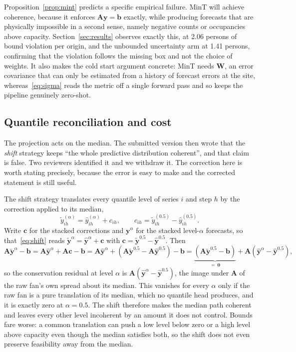 \documentclass[11pt]{article}
\theoremstyle{plain}
\theoremstyle{definition}
\theoremstyle{remark}
\newcommand{\bA}{\bm{A}}
\newcommand{\by}{\bm{y}}
\newcommand{\bb}{\bm{b}}
\newcommand{\yhat}{\hat{\by}}
\newcommand{\ytil}{\tilde{\by}}
\newif\ifrevisionmarkup
\newcommand{\new}[1]{\ifrevisionmarkup\textcolor{revision}{#1}\else#1\fi}
\begin{document}
Proposition~\ref{prop:mint} predicts a specific empirical failure. MinT will achieve coherence, because it enforces $\bA\by=\bb$ exactly, while producing forecasts that are physically impossible in a second sense, namely negative counts or occupancies above capacity. Section~\ref{sec:results} observes exactly this, at \new{\num{2.06}} persons of bound violation per origin\new{, and the unbounded uncertainty arm at \num{1.41} persons, confirming that the violation follows the missing box and not the choice of weights}. It also makes the cold start argument concrete: MinT needs $\bm{W}$, an error covariance that can only be estimated from a history of forecast errors at the site, whereas~\eqref{eq:sigma} reads the metric off a single forward pass and so keeps the pipeline genuinely zero-shot.

\subsection{Quantile reconciliation and cost}

The projection acts on the median. The submitted version then wrote that the \emph{shift} strategy keeps ``the whole predictive distribution coherent'', and \new{that claim is false. Two reviewers identified it and we withdraw it. The correction here is worth stating precisely, because the error is easy to make and the corrected statement is still useful.}

The shift strategy translates every quantile level of series $i$ and step $h$ by the correction applied to its median,
\begin{equation}
\tilde{y}^{(\alpha)}_{ih} = \hat{y}^{(\alpha)}_{ih} + c_{ih},
\qquad
c_{ih} = \tilde{y}^{(0.5)}_{ih} - \hat{y}^{(0.5)}_{ih}.
\label{eq:shift}
\end{equation}
\new{Write $\bm{c}$ for the stacked corrections and $\by^{\alpha}$ for the stacked level-$\alpha$ forecasts, so that~\eqref{eq:shift} reads $\ytil^{\alpha} = \yhat^{\alpha} + \bm{c}$ with $\bm{c} = \ytil^{0.5} - \yhat^{0.5}$. Then}
\new{\begin{equation}
\bA\ytil^{\alpha} - \bb
= \bA\yhat^{\alpha} + \bA\bm{c} - \bb
= \bA\yhat^{\alpha} + \left(\bA\ytil^{0.5} - \bA\yhat^{0.5}\right) - \bb
= \underbrace{\left(\bA\ytil^{0.5} - \bb\right)}_{=\,\bm{0}} + \bA\left(\yhat^{\alpha} - \yhat^{0.5}\right),
\label{eq:shiftresidual}
\end{equation}}
\new{so the conservation residual at level $\alpha$ is $\bA(\yhat^{\alpha} - \yhat^{0.5})$, the image under $\bA$ of the raw fan's own spread about its median. This vanishes for every $\alpha$ only if the raw fan is a pure translation of its median, which no quantile head produces, and it is exactly zero at $\alpha = 0.5$. The shift therefore makes the median path coherent and leaves every other level incoherent by an amount it does not control. Bounds fare worse: a common translation can push a low level below zero or a high level above capacity even though the median satisfies both, so the shift does not even preserve feasibility away from the median.}
\end{document}
